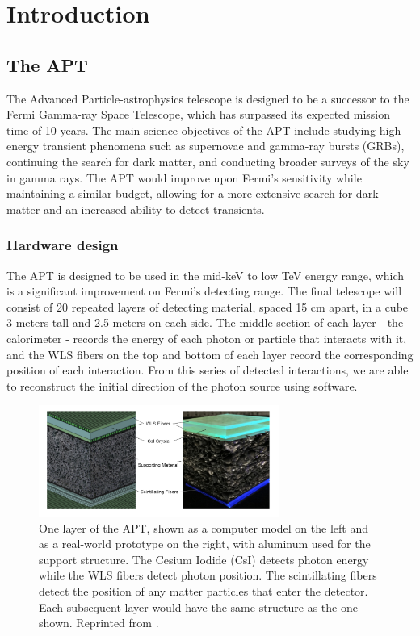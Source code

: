 \chapter{Introduction}
\label{cpt:format}


\section{The APT}

The Advanced Particle-astrophysics telescope is designed to be a successor to the Fermi Gamma-ray Space Telescope, which has surpassed its expected mission time of 10 years. The main science objectives of the APT include studying high-energy transient phenomena such as supernovae and gamma-ray bursts (GRBs), continuing the search for dark matter, and conducting broader surveys of the sky in gamma rays. The APT would improve upon Fermi's sensitivity while maintaining a similar budget, allowing for a more extensive search for dark matter and an increased ability to detect transients.

\subsection{Hardware design}

The APT is designed to be used in the mid-keV to low TeV energy range, which is a significant improvement on Fermi's detecting range. The final telescope will consist of 20 repeated layers of detecting material, spaced 15 cm apart, in a cube 3 meters tall and 2.5 meters on each side. The middle section of each layer - the calorimeter - records the energy of each photon or particle that interacts with it, and the WLS fibers on the top and bottom of each layer record the corresponding position of each interaction. From this series of detected interactions, we are able to reconstruct the initial direction of the photon source using software.

\begin{figure}
    \centering
    \includegraphics[width=0.7\textwidth]{APT_layers.png}
    \caption{One layer of the APT, shown as a computer model on the left and as a real-world prototype on the right, with aluminum used for the support structure. The Cesium Iodide (CsI) detects photon energy while the WLS fibers detect photon position. The scintillating fibers detect the position of any matter particles that enter the detector. Each subsequent layer would have the same structure as the one shown. Reprinted from \cite{APTmemo}.}
    \label{fig:APT_layer}
\end{figure}

